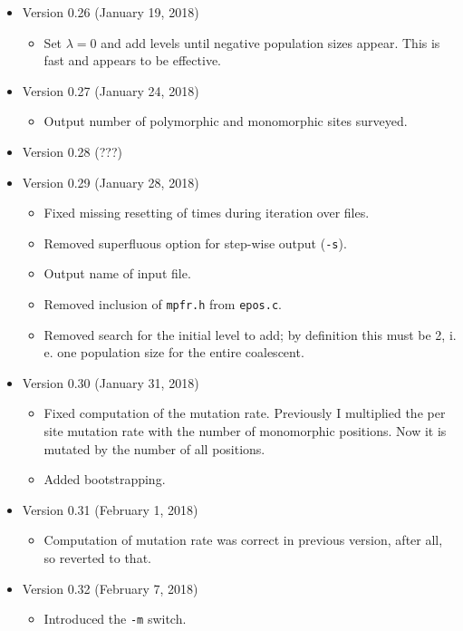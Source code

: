\documentclass[a4paper]{article}
\newcommand{\ty}{\texttt}
\begin{document}
\begin{itemize}
\item Version 0.26 (January 19, 2018)
  \begin{itemize}
  \item Set $\lambda=0$ and add levels until negative population sizes
    appear. This is fast and appears to be effective.
  \end{itemize}
\item Version 0.27 (January 24, 2018)
  \begin{itemize}
  \item Output number of polymorphic and monomorphic sites surveyed.
  \end{itemize}
\item Version 0.28 (???)
\item Version 0.29 (January 28, 2018)
  \begin{itemize}
  \item Fixed missing resetting of times during iteration over files.
  \item Removed superfluous option for step-wise output (\ty{-s}).
  \item Output name of input file.
  \item Removed inclusion of \ty{mpfr.h} from \ty{epos.c}.
  \item Removed search for the initial level to add; by definition
    this must be 2, i. e. one population size for the entire coalescent.
  \end{itemize}
\item Version 0.30 (January 31, 2018)
  \begin{itemize}
  \item Fixed computation of the mutation rate. Previously I
    multiplied the per site mutation rate with the number of
    monomorphic positions. Now it is mutated by the number of all
    positions.
  \item Added bootstrapping.
  \end{itemize}
\item Version 0.31 (February 1, 2018)
  \begin{itemize}
    \item Computation of mutation rate was correct in previous
      version, after all, so reverted to that.
  \end{itemize}
\item Version 0.32 (February 7, 2018)
  \begin{itemize}
    \item Introduced the \ty{-m} switch.
  \end{itemize}

\end{itemize}
\end{document}
